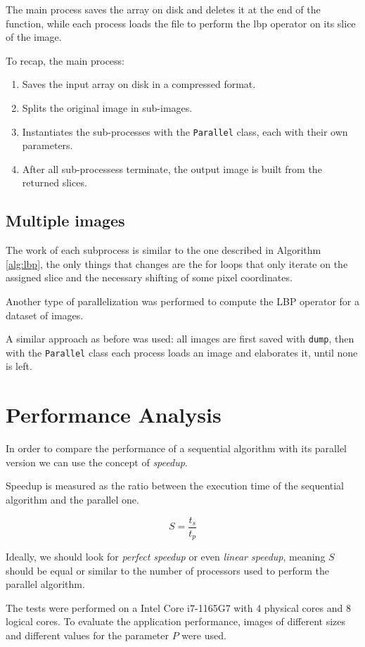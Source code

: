 \documentclass[10pt,twocolumn,letterpaper]{article}
\begin{document}
The main process saves the array on disk and deletes it at the end of the function, while each process loads the file to perform the lbp operator on its slice of the image. 

To recap, the main process:

\begin{enumerate}
	\item Saves the input array on disk in a compressed format.
	\item Splits the original image in sub-images.
	\item Instantiates the sub-processes with the \verb"Parallel" class, each with their own parameters.
	\item After all sub-processess terminate, the output image is built from the returned slices.
\end{enumerate}

\subsection{Multiple images}

The work of each subprocess is similar to the one described in Algorithm \ref{alg:lbp}, the only things that changes are the for loops that only iterate on the assigned slice and the necessary shifting of some pixel coordinates. 

Another type of parallelization was performed to compute the LBP operator for a dataset of images.

A similar approach as before was used: all images are first saved with \verb"dump", then with the \verb"Parallel" class each process loads an image and elaborates it, until none is left.

\section{Performance Analysis}
In order to compare the performance of a sequential algorithm with its parallel version we can use the concept of \textit{speedup}.

Speedup is measured as the ratio between the execution time of the sequential algorithm and the parallel one.

\[S = \frac{t_s}{t_p}\]

Ideally, we should look for \textit{perfect speedup} or even \textit{linear speedup}, meaning $S$ should be equal or similar to the number of processors used to perform the parallel algorithm.

The tests were performed on a Intel Core i7-1165G7 with 4 physical cores and 8 logical cores. To evaluate the application performance, images of different sizes and different values for the parameter $P$ were used.
\end{document}
